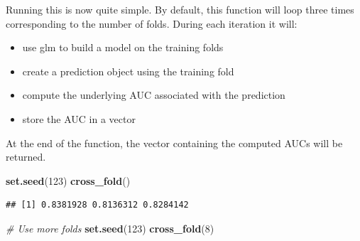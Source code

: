 \documentclass[]{book}
\newenvironment{Shaded}{\begin{snugshade}}{\end{snugshade}}
\newcommand{\KeywordTok}[1]{\textcolor[rgb]{0.13,0.29,0.53}{\textbf{#1}}}
\newcommand{\DataTypeTok}[1]{\textcolor[rgb]{0.13,0.29,0.53}{#1}}
\newcommand{\DecValTok}[1]{\textcolor[rgb]{0.00,0.00,0.81}{#1}}
\newcommand{\StringTok}[1]{\textcolor[rgb]{0.31,0.60,0.02}{#1}}
\newcommand{\CommentTok}[1]{\textcolor[rgb]{0.56,0.35,0.01}{\textit{#1}}}
\newcommand{\OperatorTok}[1]{\textcolor[rgb]{0.81,0.36,0.00}{\textbf{#1}}}
\newcommand{\NormalTok}[1]{#1}
\providecommand{\tightlist}{%
  \setlength{\itemsep}{0pt}\setlength{\parskip}{0pt}}
\begin{document}
\begin{Shaded}
\end{Shaded}

Running this is now quite simple. By default, this function will loop
three times corresponding to the number of folds. During each iteration
it will:

\begin{itemize}
\tightlist
\item
  use glm to build a model on the training folds
\item
  create a prediction object using the training fold
\item
  compute the underlying AUC associated with the prediction
\item
  store the AUC in a vector
\end{itemize}

At the end of the function, the vector containing the computed AUCs will
be returned.

\begin{Shaded}
\begin{Highlighting}[]
\KeywordTok{set.seed}\NormalTok{(}\DecValTok{123}\NormalTok{)}
\KeywordTok{cross_fold}\NormalTok{()}
\end{Highlighting}
\end{Shaded}

\begin{verbatim}
## [1] 0.8381928 0.8136312 0.8284142
\end{verbatim}

\begin{Shaded}
\begin{Highlighting}[]
\CommentTok{# Use more folds}
\KeywordTok{set.seed}\NormalTok{(}\DecValTok{123}\NormalTok{)}
\KeywordTok{cross_fold}\NormalTok{(}\DecValTok{8}\NormalTok{)}
\end{Highlighting}
\end{Shaded}
\end{document}
